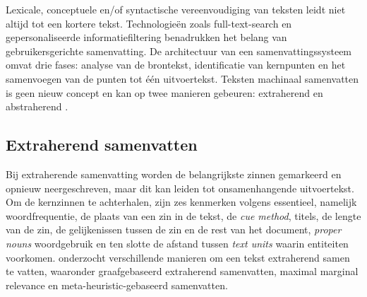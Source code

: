 Lexicale, conceptuele en/of syntactische vereenvoudiging van teksten leidt niet altijd tot een kortere tekst. Technologieën zoals full-text-search en gepersonaliseerde informatiefiltering benadrukken het belang van gebruikersgerichte samenvatting. De architectuur van een samenvattingssysteem omvat drie fases: analyse van de brontekst, identificatie van kernpunten en het samenvoegen van de punten tot één uitvoertekst. Teksten machinaal samenvatten is geen nieuw concept en kan op twee manieren gebeuren: extraherend en abstraherend \autocite{Hahn2000, Dubay2004}.



\subsection{Extraherend samenvatten}

Bij extraherende samenvatting worden de belangrijkste zinnen gemarkeerd en opnieuw neergeschreven, maar dit kan leiden tot onsamenhangende uitvoertekst. Om de kernzinnen te achterhalen, zijn zes kenmerken volgens \textcite{Khan2014} essentieel, namelijk woordfrequentie, de plaats van een zin in de tekst, de \textit{cue method}, titels, de lengte van de zin, de gelijkenissen tussen de zin en de rest van het document, \textit{proper nouns} woordgebruik en ten slotte de afstand tussen \textit{text units} waarin entiteiten voorkomen. \textcite{Verma2020} onderzocht verschillende manieren om een tekst extraherend samen te vatten, waaronder graafgebaseerd extraherend samenvatten, maximal marginal relevance en meta-heuristic-gebaseerd samenvatten.

